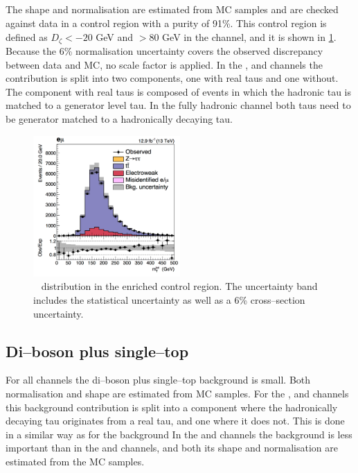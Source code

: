 \subsection{\texorpdfstring{\ttbar}{ttbar}}
\label{sec:mssm_bkgs_tt}
The \ttbar shape and normalisation are estimated from \ac{MC} 
samples and are checked against data in a control
region with a \ttbar purity of 91\%. This control region
is defined as $D_{\zeta} < -20$ GeV and \MET $>80$ GeV in 
the \emu channel, and it is shown in \ref{fig:mssm_corrs_toppt}.
Because the 6\%
\ttbar normalisation uncertainty covers the observed
discrepancy between data and \ac{MC}, no scale factor is applied.
In the \mutau, \etau and \tautau channels
the \ttbar contribution is split into
two components, one with real taus and 
one without. The component with real taus is composed
of \ttbar events in which the hadronic tau is matched
to a generator level tau. In the fully hadronic channel
both taus need to be generator matched to a hadronically
decaying tau.

\begin{figure}[h!]
\begin{center}
\includegraphics[width=0.5\textwidth]{./MSSM/Figures/mt_tot_ttcontrol_em_2016.png}
\end{center}
\caption{\mTtot~ distribution in the \ttbar enriched control region.
The uncertainty band includes the statistical uncertainty as well as a 6\% \ttbar cross--section uncertainty.}
\label{fig:mssm_corrs_toppt}
\end{figure}


\subsection{Di--boson plus single--top}
\label{sec:mssm_bkgs_other}
For all channels the di--boson plus 
single--top background is small.
Both normalisation and shape are estimated from \ac{MC}
samples. For the \etau, \mutau and \tautau channels
this background contribution is split into a component
where the hadronically decaying tau originates from a real
tau, and one where it does not. This is done in a similar
way as for the \ttbar background
In the \tautau and \emu channels the \Wjets background
is less important than in the \etau and \mutau channels, and both
its shape and normalisation are estimated from the
\ac{MC} samples.


